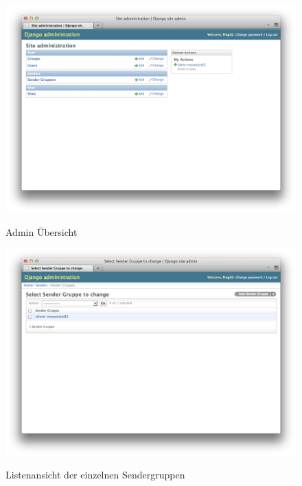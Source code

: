 \begin{figure}[H]
	\centering			      
        \includegraphics[scale=0.3]{images/admin-index.png}\\
		\caption{Admin Übersicht}
	\label{fig:admin-index}
\end{figure}

\begin{figure}[H]
	\centering			      
        \includegraphics[scale=0.3]{images/group-index.png}\\
		\caption{Listenansicht der einzelnen Sendergruppen}
	\label{fig:group-index}
\end{figure}

